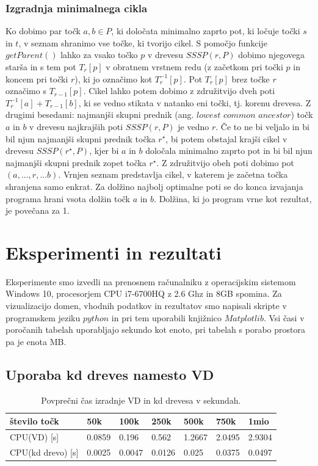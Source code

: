 \documentclass[a4paper, 12pt]{book}
\begin{document}
\subsection{Izgradnja minimalnega cikla}
Ko dobimo par točk $a, b\in P$, ki določata minimalno zaprto pot, ki ločuje točki $s$ in $t$, v seznam shranimo vse točke, ki tvorijo cikel. S pomočjo funkcije $getParent()$ lahko za vsako točko $p$ v drevesu $SSSP(r, P)$ dobimo njegovega starša in s tem pot $T_r[p]$ v obratnem vrstnem redu (z začetkom pri točki $p$ in koncem pri točki $r$), ki jo označimo kot $T_r^{-1}[p]$. Pot $T_r[p]$ brez točke $r$ označimo s $T_{r-1}[p]$. Cikel lahko potem dobimo z združitvijo dveh poti $T_r^{-1}[a] + T_{r-1}[b]$, ki se vedno stikata v natanko eni točki, tj. korenu drevesa. Z drugimi besedami: najmanjši skupni prednik (ang. $lowest$ $common$ $ancestor$) točk $a$ in $b$ v drevesu najkrajših poti $SSSP(r, P)$ je vedno $r$. Če to ne bi veljalo in bi bil njun najmanjši skupni prednik točka $r^\star$, bi potem obstajal krajši cikel v drevesu $SSSP(r^\star, P)$, kjer bi $a$ in $b$ določala minimalno zaprto pot in bi bil njun najmanjši skupni prednik zopet točka $r^\star$. Z združitvijo obeh poti dobimo pot $(a,...,r,...b)$. Vrnjen seznam predstavlja cikel, v katerem je začetna točka shranjena samo enkrat.  Za dolžino najbolj optimalne poti se do konca izvajanja programa hrani vsota dolžin točk $a$ in $b$. Dolžina, ki jo program vrne kot rezultat, je povečana za 1. 


\chapter{Eksperimenti in rezultati}
\label{Rezultati}
Eksperimente smo izvedli na prenosnem računalniku z operacijskim sistemom Windows 10, procesorjem CPU i7-6700HQ z 2.6 Ghz in 8GB spomina. Za vizualizacijo domen, vhodnih podatkov in rezultatov smo napisali skripte v programskem jeziku $python$ in pri tem uporabili knjižnico $Matplotlib$. Vsi časi v poročanih tabelah uporabljajo sekundo kot enoto, pri tabelah s porabo prostora pa je enota MB.
\section{Uporaba kd dreves namesto VD}

\begin{table}
\begin{center}
\begin{tabular}{l|l|l|l|l|l|l}
\hline
število točk & 50k & 100k & 250k & 500k & 750k & 1mio \\ \hline \hline
CPU(VD) [s] & 0.0859 & 0.196 & 0.562 & 1.2667 & 2.0495 & 2.9304 \\ \hline
CPU(kd drevo) [s] & 0.0025 & 0.0047 & 0.0126 & 0.025 & 0.0375 & 0.0497
\end{tabular}
\caption{Povprečni čas izradnje VD in kd drevesa v sekundah.}
\label{cpu-compare}
\end{center}
\end{table}
\end{document}
